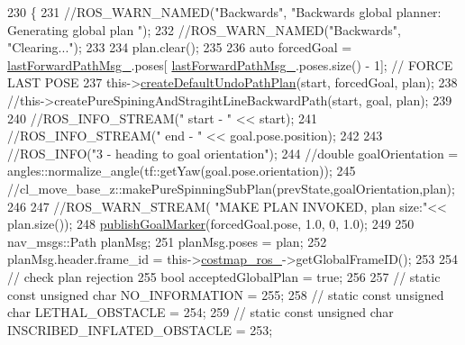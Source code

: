 \begin{DoxyCode}
230         \{
231             \textcolor{comment}{//ROS\_WARN\_NAMED("Backwards", "Backwards global planner: Generating global plan ");}
232             \textcolor{comment}{//ROS\_WARN\_NAMED("Backwards", "Clearing...");}
233 
234             plan.clear();
235 
236             \textcolor{keyword}{auto} forcedGoal = \hyperlink{classcl__move__base__z_1_1undo__path__global__planner_1_1UndoPathGlobalPlanner_a9a4a6e40f5b6cb5f77dedbc5b6170871}{lastForwardPathMsg\_}.poses[
      \hyperlink{classcl__move__base__z_1_1undo__path__global__planner_1_1UndoPathGlobalPlanner_a9a4a6e40f5b6cb5f77dedbc5b6170871}{lastForwardPathMsg\_}.poses.size() - 1]; \textcolor{comment}{// FORCE LAST POSE}
237             this->\hyperlink{classcl__move__base__z_1_1undo__path__global__planner_1_1UndoPathGlobalPlanner_a659c16f439d33ac7026a54bb65c26ca8}{createDefaultUndoPathPlan}(start, forcedGoal, plan);
238             \textcolor{comment}{//this->createPureSpiningAndStragihtLineBackwardPath(start, goal, plan);}
239 
240             \textcolor{comment}{//ROS\_INFO\_STREAM(" start - " << start);}
241             \textcolor{comment}{//ROS\_INFO\_STREAM(" end - " << goal.pose.position);}
242 
243             \textcolor{comment}{//ROS\_INFO("3 - heading to goal orientation");}
244             \textcolor{comment}{//double goalOrientation = angles::normalize\_angle(tf::getYaw(goal.pose.orientation));}
245             \textcolor{comment}{//cl\_move\_base\_z::makePureSpinningSubPlan(prevState,goalOrientation,plan);}
246 
247             \textcolor{comment}{//ROS\_WARN\_STREAM( "MAKE PLAN INVOKED, plan size:"<< plan.size());}
248             \hyperlink{classcl__move__base__z_1_1undo__path__global__planner_1_1UndoPathGlobalPlanner_a37a85e1cd57173902d8302cb8cb9b933}{publishGoalMarker}(forcedGoal.pose, 1.0, 0, 1.0);
249 
250             nav\_msgs::Path planMsg;
251             planMsg.poses = plan;
252             planMsg.header.frame\_id = this->\hyperlink{classcl__move__base__z_1_1undo__path__global__planner_1_1UndoPathGlobalPlanner_ab63eeb465e3ae989a6edcc4d059cf8f0}{costmap\_ros\_}->getGlobalFrameID();
253 
254             \textcolor{comment}{// check plan rejection}
255             \textcolor{keywordtype}{bool} acceptedGlobalPlan = \textcolor{keyword}{true};
256 
257             \textcolor{comment}{// static const unsigned char NO\_INFORMATION = 255;}
258             \textcolor{comment}{// static const unsigned char LETHAL\_OBSTACLE = 254;}
259             \textcolor{comment}{// static const unsigned char INSCRIBED\_INFLATED\_OBSTACLE = 253;}

\end{DoxyCode}
